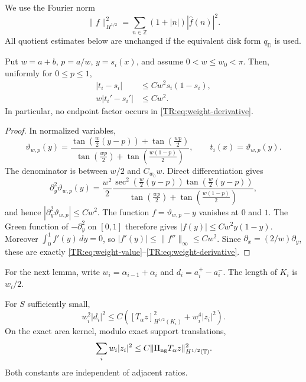 We use the Fourier norm
\begin{equation}\label{TR:eq:Hhalf}
 \|f\|_{H^{1/2}}^2
 =\sum_{n\in\mathbb Z}(1+|n|)|\widehat f(n)|^2.
\end{equation}
All quotient estimates below are unchanged if the equivalent disk form
$q_{\mathbb D}$ is used.

\begin{lemma}
\label{TR:lem:weight-jets}
Put $w=a+b$, $p=a/w$, $y=s_i(x)$, and assume $0<w\le w_0<\pi$.
Then, uniformly for $0\le p\le1$,
\begin{align}
 |t_i-s_i|&\le Cw^2s_i(1-s_i),
 \label{TR:eq:weight-value}\\
 w|t_i'-s_i'|&\le Cw^2.
 \label{TR:eq:weight-derivative}
\end{align}
In particular, no endpoint factor occurs in
\eqref{TR:eq:weight-derivative}.
\end{lemma}

\begin{proof}
In normalized variables,
\begin{equation}\label{TR:eq:normalized-t}
 \vartheta_{w,p}(y)=
 \frac{\tan(\frac w2(y-p))+\tan(\frac{wp}2)}
 {\tan(\frac{wp}2)+\tan(\frac{w(1-p)}2)},
 \qquad t_i(x)=\vartheta_{w,p}(y).
\end{equation}
The denominator is between $w/2$ and $C_{w_0}w$.  Direct
differentiation gives
\begin{equation}\label{TR:eq:normalized-second}
 \partial_y^2\vartheta_{w,p}(y)
 =\frac{w^2}{2}
 \frac{\sec^2(\frac w2(y-p))\tan(\frac w2(y-p))}
 {\tan(\frac{wp}2)+\tan(\frac{w(1-p)}2)},
\end{equation}
and hence $|\partial_y^2\vartheta_{w,p}|\le Cw^2$.
The function $f=\vartheta_{w,p}-y$ vanishes at $0$ and $1$.
The Green function of $-\partial_y^2$ on $[0,1]$ therefore gives
$|f(y)|\le Cw^2y(1-y)$.  Moreover
$\int_0^1f'(y)\,dy=0$, so
$|f'(y)|\le\|f''\|_\infty\le Cw^2$.  Since
$\partial_x=(2/w)\partial_y$, these are exactly
\eqref{TR:eq:weight-value}--\eqref{TR:eq:weight-derivative}.
\end{proof}

For the next lemma, write $w_i=\alpha_{i-1}+\alpha_i$ and
$d_i=a_i^+-a_i^-$.  The length of $K_i$ is $w_i/2$.

\begin{lemma}
\label{TR:lem:coefficient-stability}
For $S$ sufficiently small,
\begin{equation}\label{TR:eq:local-coefficient}
 w_i^2|d_i|^2
 \le C\left(
 [T_\alpha z]_{H^{1/2}(K_i)}^2+w_i^4|z_i|^2\right).
\end{equation}
On the exact area kernel, modulo exact support translations,
\begin{equation}\label{TR:eq:nodal-sampling}
 \sum_iw_i|z_i|^2
 \le C\|\Pi_{\rm ng} T_\alpha z\|_{H^{1/2}(\mathbb T)}^2.
\end{equation}
Both constants are independent of adjacent ratios.
\end{lemma}

